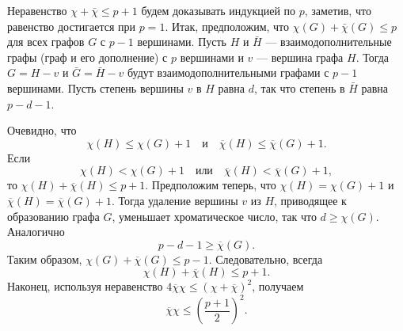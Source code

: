 Неравенство $\chi + \bar{\chi} \leq p + 1$ будем доказывать индукцией по $p$, заметив, что равенство достигается при $p = 1$. Итак, предположим, что $\chi(G) + \bar{\chi}(G) \leq p$ для всех графов $G$ с $p - 1$ вершинами. Пусть $H$ и $\bar{H}$ — взаимодополнительные графы (граф и его дополнение) с $p$ вершинами и $v$ — вершина графа $H$. Тогда $G = H - v$ и $\bar{G} = \bar{H} - v$ будут взаимодополнительными графами с $p - 1$ вершинами. Пусть степень вершины $v$ в $H$ равна $d$, так что степень в $\bar{H}$ равна $p - d - 1$.


Очевидно, что
\[
\chi(H) \leq \chi(G) + 1 \quad \text{и} \quad \overline{\chi}(H) \leq \overline{\chi}(G) + 1.
\]
Если
\[
\chi(H) < \chi(G) + 1 \quad \text{или} \quad \overline{\chi}(H) < \overline{\chi}(G) + 1,
\]
то \(\chi(H) + \overline{\chi}(H) \leq p + 1\). Предположим теперь, что \(\chi(H) = \chi(G) + 1\) и \(\overline{\chi}(H) = \overline{\chi}(G) + 1\). Тогда удаление вершины \(v\) из \(H\), приводящее к образованию графа \(G\), уменьшает хроматическое число, так что \(d \geq \chi(G)\). Аналогично
\[
p - d - 1 \geq \overline{\chi}(G).
\]
Таким образом, \(\chi(G) + \overline{\chi}(G) \leq p - 1\). Следовательно, всегда
\[
\chi(H) + \overline{\chi}(H) \leq p + 1.
\]
Наконец, используя неравенство \(4\overline{\chi}\chi \leq (\chi + \overline{\chi})^2\), получаем
\[
\overline{\chi}\chi \leq \left(\frac{p + 1}{2}\right)^2.
\]